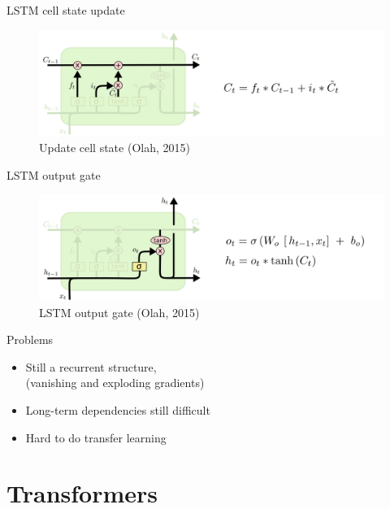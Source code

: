 \documentclass[10pt]{beamer}
\begin{document}
\begin{frame}{LSTM cell state update}

\begin{figure}[h]
\centering
\includegraphics[width=1\textwidth]{fig/Olah_LSTM3_update2.png}
\caption{Update cell state (Olah, 2015)}
\end{figure}

\end{frame}

\begin{frame}{LSTM output gate}

\begin{figure}[h]
\centering
\includegraphics[width=1\textwidth]{fig/Olah_LSTM3_output.png}
\caption{LSTM output gate (Olah, 2015)}
\end{figure}

\end{frame}


\begin{frame}{Problems}

\begin{itemize}
\item Still a {\color{uured} recurrent structure},\\(vanishing and exploding gradients)
\item Long-term dependencies still difficult
\item Hard to do {\color{uured} transfer learning}
\end{itemize}


\end{frame}


\section{Transformers}
\frame{\sectionpage}
\end{document}
